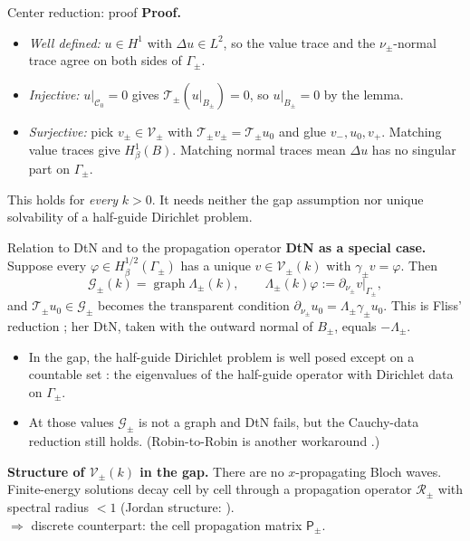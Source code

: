 \documentclass[aspectratio=169]{beamer}
\begin{document}
\begin{frame}{Center reduction: proof}
  \small
  \textbf{Proof.}
  \begin{itemize}
    \item \emph{Well defined:} $u\in H^1$ with $\Delta u\in L^2$, so the value trace and
      the $\nu_\pm$-normal trace agree on both sides of $\Gamma_\pm$.
    \item \emph{Injective:} $u|_{\mathcal C_0}=0$ gives $\mathscr T_\pm(u|_{B_\pm})=0$,
      so $u|_{B_\pm}=0$ by the lemma.
    \item \emph{Surjective:} pick $v_\pm\in\mathcal V_\pm$ with
      $\mathscr T_\pm v_\pm=\mathscr T_\pm u_0$ and glue $v_-,u_0,v_+$. Matching
      value traces give $H^1_\beta(B)$. Matching normal traces mean $\Delta u$ has no
      singular part on $\Gamma_\pm$.
  \end{itemize}

  \begin{alertblock}{}
    This holds for \emph{every} $k>0$. It needs neither the gap assumption nor
    unique solvability of a half-guide Dirichlet problem.
  \end{alertblock}
\end{frame}

\begin{frame}{Relation to DtN and to the propagation operator}
  \small
  \textbf{DtN as a special case.} Suppose every $\varphi\in H^{1/2}_\beta(\Gamma_\pm)$ has a
  unique $v\in\mathcal V_\pm(k)$ with $\gamma_\pm v=\varphi$. Then
  \[
    \mathcal G_\pm(k)=\operatorname{graph}\Lambda_\pm(k),\qquad
    \Lambda_\pm(k)\varphi:=\partial_{\nu_\pm}v|_{\Gamma_\pm},
  \]
  and $\mathscr T_\pm u_0\in\mathcal G_\pm$ becomes the transparent condition
  $\partial_{\nu_\pm}u_0=\Lambda_\pm\gamma_\pm u_0$. This is Fliss' reduction
  \cite[Thm.~4.5]{Fliss2013}; her DtN, taken with the outward normal of $B_\pm$,
  equals $-\Lambda_\pm$.

  \begin{itemize}
    \item In the gap, the half-guide Dirichlet problem is well posed except on a
      countable set \cite[Thm.~4.1]{Fliss2013}: the eigenvalues of the half-guide
      operator with Dirichlet data on $\Gamma_\pm$.
    \item At those values $\mathcal G_\pm$ is not a graph and DtN fails, but the
      Cauchy-data reduction still holds. (Robin-to-Robin is another workaround
      \cite{FlissKlindworthSchmidt2015}.)
  \end{itemize}

  \textbf{Structure of $\mathcal V_\pm(k)$ in the gap.} There are no $x$-propagating
  Bloch waves. Finite-energy solutions decay cell by cell through a propagation
  operator $\mathcal R_\pm$ with spectral radius $<1$ \cite{JolyLiFliss2006}
  (Jordan structure: \cite{HohageSoussi2013}).\\
  $\Rightarrow$ discrete counterpart: the cell propagation matrix $\mathsf P_\pm$.
\end{frame}
\end{document}
